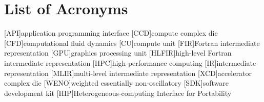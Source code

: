 \section*{List of Acronyms}

\begin{acronym}[paper]
[API]{application programming interface}
[CCD]{compute complex die}
[CFD]{computational fluid dynamics}
[CU]{compute unit}
[FIR]{Fortran intermediate representation}
[GPU]{graphics processing unit}
[HLFIR]{high-level Fortran intermediate representation}
[HPC]{high-performance computing}
[IR]{intermediate representation}
[MLIR]{multi-level intermediate representation}
[XCD]{accelerator complex die}
[WENO]{weighted essentially non-oscillatory}
[SDK]{software development kit}
[HIP]{Heterogeneous-computing Interface for Portability}
\end{acronym}